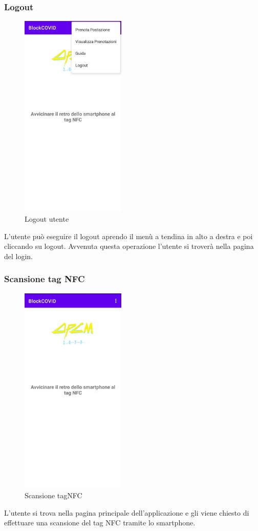 	\subsubsection{Logout}
	\begin{figure}[H]
		\centering
		\includegraphics[width=5cm]{res/images/menuATendina.png}
		\caption{Logout utente}
	\end{figure}
	L'utente può eseguire il logout aprendo il menù a tendina in alto a destra e poi cliccando su logout. Avvenuta questa operazione l'utente si troverà nella pagina del login.
	
	\subsubsection{Scansione tag NFC}
	\begin{figure}[H]
		\centering
		\includegraphics[width=5cm]{res/images/avvicinaSmartphone.png}
		\caption{Scansione tagNFC}
	\end{figure}
	L'utente si trova nella pagina principale dell'applicazione e gli viene chiesto di effettuare una scansione del tag NFC tramite lo smartphone. 
